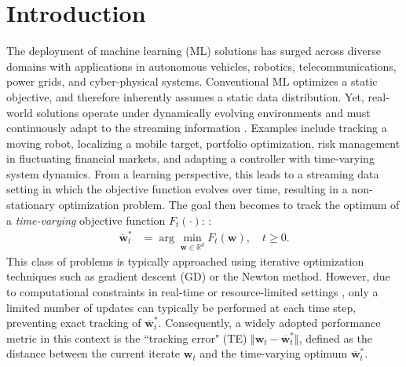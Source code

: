 \documentclass[conference]{IEEEtran}
\newcommand{\nm}[1]{\textcolor{magenta}{\bf [NM: #1]}}
\begin{document}


\section{Introduction}

The deployment of machine learning (ML) solutions has surged across
diverse domains with applications in autonomous vehicles, robotics,
telecommunications, power grids, and cyber-physical
systems. Conventional ML optimizes a static objective, and therefore inherently assumes a static data distribution. Yet, real-world solutions operate under dynamically
evolving environments and must continuously adapt to the streaming
information
\cite{Time_Structured,Ali_Sayed2014Adaptation,CL_Survey}. Examples
include tracking a moving robot, localizing a mobile target, portfolio
optimization, risk management in fluctuating financial markets, and
adapting a controller with time-varying system dynamics. From a
learning perspective, this leads to a streaming data setting in which
the objective function evolves over time, resulting in a
non-stationary optimization problem. The goal then becomes to track
the optimum of a \emph{time-varying} objective function $F_t(\cdot)$:
\cite{Polyak_book,tracking_minimum_1998,Time_Structured}:
\begin{align}
\overline{\mathbf{w}}^*_t &= \arg \min_{\mathbf{w}\in \mathbb{R}^d} F_t(\mathbf{w}), \quad t\geq0.
\label{generic_TV}
\end{align}
This class of problems is typically approached using iterative
optimization techniques such as gradient descent (GD) or the Newton
method. 
However, due to computational constraints in real-time or resource-limited settings \cite{Time_Structured,DallAnese2019_stream}, only a limited number of updates can typically be performed at each time step, preventing exact tracking of $\overline{\mathbf{w}}^*_t$.
Consequently, a widely adopted performance metric in this
context is the ``tracking error" (TE) $\Vert
\mathbf{w}_t - \overline{\mathbf{w}}^*_t \Vert$, defined as the distance between the current iterate $\mathbf{w}_t$ and the time-varying optimum $\overline{\mathbf{w}}_t^*$.
\end{document}
